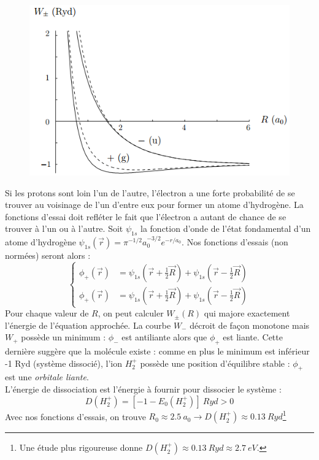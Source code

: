 \documentclass	[11pt, a4paper, openany]{book}
\begin{document}
\begin{figure}
\includegraphics[scale=0.3]{img/image5.png}
\end{figure}
Si les protons sont loin l'un de l'autre, l'électron a une forte probabilité de se trouver 
au voisinage de l'un d'entre eux pour former un atome d'hydrogène. La fonctions d'essai
doit refléter le fait que l’électron a autant de chance de se trouver à l'un ou à l'autre.
 Soit $\psi_{1s}$  la fonction d'onde de l'état fondamental d'un atome d'hydrogène $\psi_{1s}
 (\vec{r}) = \pi^{-1/2}a_0^{-3/2}e^{-r/a_0}$. Nos fonctions d'essais (non normées) seront alors : 
\begin{equation}
\left\{\begin{array}{ll}
\phi_+(\vec{r}) &= \psi_{1s}(\vec{r}+\frac{1}{2}\vec{R})+\psi_{1s}(\vec{r}-\frac{1}{2}\vec{R})\\
\phi_+(\vec{r}) &= \psi_{1s}(\vec{r}+\frac{1}{2}\vec{R})+\psi_{1s}(\vec{r}-\frac{1}{2}\vec{R})
\end{array}\right.
\end{equation}
Pour chaque valeur de $R$, on peut calculer $W_\pm(R)$ qui majore exactement l'énergie de l'équation
approchée. La courbe $W_-$ décroit de façon monotone mais $W_+$ possède un minimum : $\phi_-$ est 
antiliante alors que $\phi_+$ est liante. Cette dernière suggère que la molécule existe : comme 
en plus le minimum est inférieur -1 Ryd (système dissocié), l'ion $H_2^+$ possède une position 
d'équilibre stable : $\phi_+$ est une \textit{orbitale liante}.\\
L'énergie de dissociation est l'énergie à fournir pour dissocier le système : 
\begin{equation}
D(H_2^+) = [-1-E_0(H_2^+)]\ Ryd > 0
\end{equation}
Avec nos fonctions d'essais, on trouve $R_0\approx 2.5\ a_0 \rightarrow D(H_2^+) \approx 0.13\ 
Ryd$\footnote{Une étude plus rigoureuse donne $D(H_2^+) \approx 0.13\ Ryd \approx 2.7\ eV$.}\\
\end{document}
